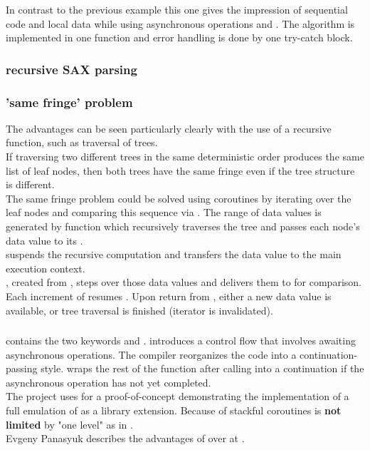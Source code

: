 In contrast to the previous example this one gives the impression of sequential
code and local data while using asynchronous operations \asyncread and
\asyncwrite. The algorithm is implemented in one function and error handling is
done by one try-catch block.

\subsubsection*{recursive SAX parsing}

\subsubsection*{'same fringe' problem}
The advantages can be seen particularly clearly with the use of a recursive
function, such as traversal of trees.\\
If traversing two different trees in the same deterministic order produces the
same list of leaf nodes, then both trees have the same fringe even if the tree
structure is different.\\
\newline
The same fringe problem could be solved using coroutines by iterating over the
leaf nodes and comparing this sequence via . The range of data
values is generated by function  which recursively traverses the
tree and passes each node's data value to its \pushcoro.\\
\pushcoro suspends the recursive computation and transfers the data value to
the main execution context.\\
\pullcoroiterator, created from \pullcoro, steps over those data values and
delivers them to  for comparison. Each increment of \pullcoroiterator
resumes . Upon return from , either
a new data value is available, or tree traversal is finished (iterator is
invalidated).

\subsubsection*{\csharp \await}
\csharp contains the two keywords \async and \await. \async introduces a
control flow that involves awaiting asynchronous operations. The compiler
reorganizes the code into a continuation-passing style. \await wraps the rest
of the function after calling \await into a continuation if the asynchronous
operation has not yet completed.\\
The project \awaitemu uses \boostcoroutine for a proof-of-concept
demonstrating the implementation of a full emulation of \csharp \await as a
library extension. Because of stackful coroutines \await is \textbf{not limited}
by "one level" as in \csharp.\\
Evgeny Panasyuk describes the advantages of \boostcoroutine over \await at
\channelnine.
